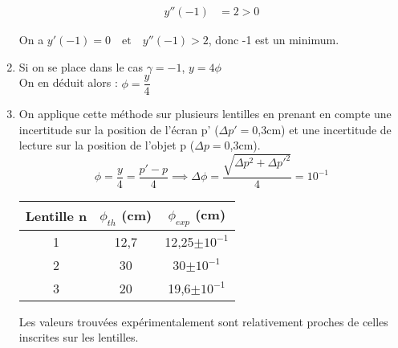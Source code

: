 \documentclass[12pt,a4paper]{article}
\begin{document}
\begin{enumerate}
\begin{multicols}{2}
\begin{align*}
			y''(-1)&=2>0
			\end{align*}
		\end{multicols}
		\vspace*{+1em}
		On a $y'(-1)=0 \quad \text{et} \quad y''(-1)>2$, donc -1 est un minimum.\\
		\item Si on se place dans le cas $\gamma=-1$, $y=4\phi$\\
		On en déduit alors : $\phi=\dfrac{y}{4}$
		\item 
		On applique cette méthode sur plusieurs lentilles en prenant en compte une incertitude sur la position de l'écran p' ($\Delta p'=$0,3cm) et une incertitude de lecture sur la position de l'objet p ($\Delta p=$0,3cm).
		$$\phi=\dfrac{y}{4}=\dfrac{p'-p}{4}\implies \Delta \phi = \dfrac{\sqrt{\Delta p^2+\Delta p'^2}}{4}=10^{-1}$$
		\begin{center}
			
			\begin{tabular}{|c|c|c|}
				\hline 
				Lentille n & $\phi_{th}$ (cm) & $\phi_{exp}$ (cm) \\ 
				\hline 
				1 & 12,7 & 12,25$\pm10^{-1}$ \\ 
				\hline 
				2 & 30 & 30$\pm10^{-1}$ \\ 
				\hline 
				3 & 20 & 19,6$\pm10^{-1}$ \\ 
				\hline 
			\end{tabular} 
		\end{center}
		Les valeurs trouvées expérimentalement sont relativement proches de celles inscrites sur les lentilles.
	\end{enumerate}
\end{document}
